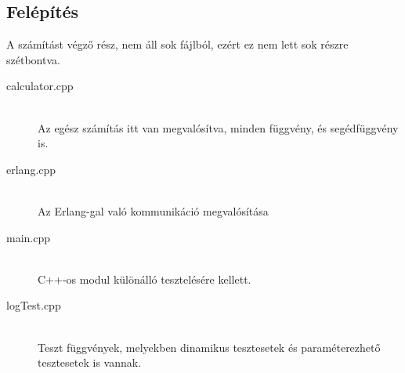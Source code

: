 \subsection{Felépítés}
	A számítást végző rész, nem áll sok fájlból, ezért ez nem lett sok részre szétbontva. 
	\begin{description}
		\item[calculator.cpp] 
		\hfill \\ Az egész számítás itt van megvalósítva, minden függvény, és segédfüggvény is.
		\item[erlang.cpp] 
		\hfill \\ Az Erlang-gal való kommunikáció megvalósítása
		\item[main.cpp] 
		\hfill \\ C++-os modul különálló tesztelésére kellett.
		\item[logTest.cpp] 
		\hfill \\ 
		Teszt függvények, melyekben dinamikus tesztesetek és paraméterezhető tesztesetek is vannak.
	\end{description}
